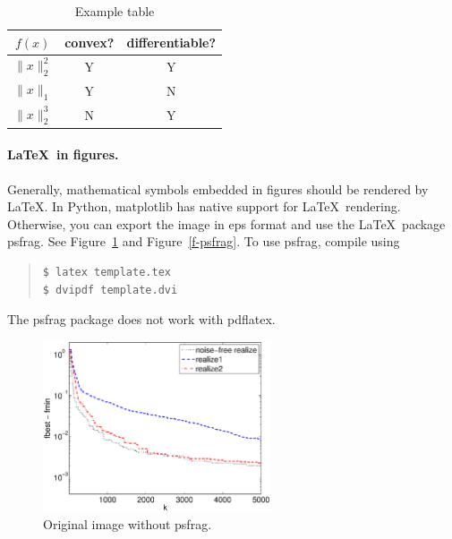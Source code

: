 \documentclass[12pt]{article}
\begin{document}
\begin{table}
\begin{minipage}{\textwidth}
\centering
\begin{tabular}{|c|c|c|}
\hline
$f(x)$      & convex? & differentiable? \\ \hline
$\|x\|_2^2$ & Y       & Y \\
$\|x\|_1$   & Y       & N \\
$\|x\|_2^3$ & N       & Y \\
\hline
\end{tabular}
\caption{Example table}
\label{t-ex1}
\end{minipage} 
\end{table}

\paragraph{\LaTeX\ in figures.}
Generally, mathematical symbols embedded in figures should be rendered by
\LaTeX. In Python, matplotlib has native support for \LaTeX\ rendering.
Otherwise, you can export the image in eps format and use the \LaTeX\ package
psfrag. See Figure~\ref{f-nopsfrag} and Figure~\ref{f-psfrag}. To use psfrag,
compile using
\begin{quote}
\begin{verbatim}
$ latex template.tex
$ dvipdf template.dvi
\end{verbatim}
\end{quote}
The psfrag package does not work with pdflatex.

\begin{figure}
\begin{center}
\includegraphics[width=0.6\textwidth]{figures/pwl_error_fbest_realize}
\end{center}
\caption{Original image without psfrag.}
\label{f-nopsfrag}
\end{figure}
\end{document}

